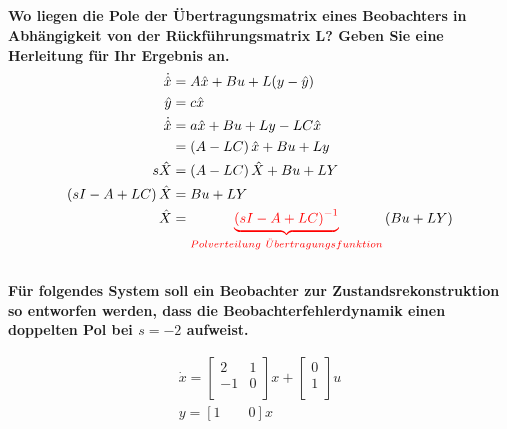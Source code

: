 \subsection{}
\textbf{Wo liegen die Pole der Übertragungsmatrix eines Beobachters in Abhängigkeit von der Rückführungsmatrix L? Geben Sie eine Herleitung für Ihr Ergebnis an.}
\begin{equation}
    \begin{aligned}
        \dot{\hat{x}}               & =A\hat{x}+Bu+L(y-\hat{y})                                                                                               \\
        \hat{y}                     & =c\hat{x}                                                                                                               \\
        \dot{\hat{x}}               & =a\hat{x}+Bu+Ly-LC\hat{x}                                                                                               \\
                                    & =\left(A-LC\right)\hat{x}+Bu+Ly                                                                                         \\
        s\hat{X}                    & =\left(A-LC\right)\hat{X}+Bu+LY                                                                                         \\
        \left(sI-A+LC\right)\hat{X} & =Bu+LY                                                                                                                  \\
        \hat{X}                     & =\textcolor{red}{\underbrace{\left(sI-A+LC\right)^{-1}}_{Polverteilung\ \ddot{U}bertragungsfunktion}}\left(Bu+LY\right) \\
    \end{aligned}
\end{equation}

\subsection{}
\textbf{Für folgendes System soll ein Beobachter zur Zustandsrekonstruktion so entworfen werden, dass die Beobachterfehlerdynamik einen doppelten Pol bei $s=-2$ aufweist.}

\begin{equation}
    \begin{array}{l}
        \dot{x}=\left[\begin{array}{cc}
                2  & 1 \\
                -1 & 0 \\
            \end{array}\right]x+\left[\begin{array}{c}
                0 \\
                1 \\
            \end{array}\right]u \\
        y=\left[1\qquad 0\right]x
    \end{array}
\end{equation}
